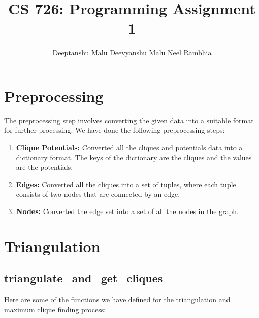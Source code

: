 \documentclass[12pt]{article}
\title{CS 726: Programming Assignment 1}
\author{Deeptanshu Malu \quad Deevyanshu Malu \quad Neel Rambhia}
\date{}
\begin{document}
\maketitle

\section{Preprocessing}

The preprocessing step involves converting the given data into a suitable format for further processing. We have done the following preprocessing steps:

\begin{enumerate}
    \item \textbf{Clique Potentials:} Converted all the cliques and potentials data into a dictionary format. The keys of the dictionary are the cliques and the values are the potentials. \item \textbf{Edges:} Converted all the cliques into a set of tuples, where each tuple consists of two nodes that are connected by an edge.
    \item \textbf{Nodes:} Converted the edge set into a set of all the nodes in the graph.
\end{enumerate}

\section{Triangulation}

\subsection{triangulate\_and\_get\_cliques}
Here are some of the functions we have defined for the triangulation and maximum clique finding process:
\end{document}
